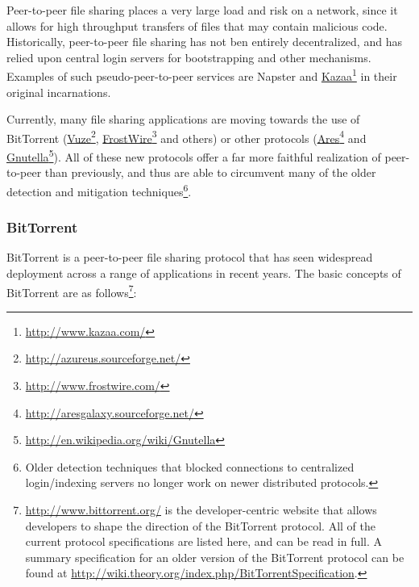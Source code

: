 \documentclass{article}
\newcommand{\hreff}[2]{\href{#1}{#2}\footnote{\url{#1}}}
\theoremstyle{remark}
\theoremstyle{definition}
\theoremstyle{definition}
\theoremstyle{definition}
\begin{document}
Peer-to-peer file sharing places a very large load and risk on a network, since it allows for high throughput transfers of files that may contain malicious code. Historically, peer-to-peer file sharing has not ben entirely decentralized, and has relied upon central login servers for bootstrapping and other mechanisms. Examples of such pseudo-peer-to-peer services are Napster and \hreff{http://www.kazaa.com/}{Kazaa} in their original incarnations.

Currently, many file sharing applications are moving towards the use of BitTorrent (\hreff{http://azureus.sourceforge.net/}{Vuze}, \hreff{http://www.frostwire.com/}{FrostWire} and others) or other protocols (\hreff{http://aresgalaxy.sourceforge.net/}{Ares} and \hreff{http://en.wikipedia.org/wiki/Gnutella}{Gnutella}). All of these new protocols offer a far more faithful realization of peer-to-peer than previously, and thus are able to circumvent many of the older detection and mitigation techniques\footnote{Older detection techniques that blocked connections to centralized login/indexing servers no longer work on newer distributed protocols.}.

\subsubsection{BitTorrent}
BitTorrent is a peer-to-peer file sharing protocol that has seen widespread deployment across a range of applications in recent years. The basic concepts of BitTorrent are as follows\footnote{\url{http://www.bittorrent.org/} is the developer-centric website that allows developers to shape the direction of the BitTorrent protocol. All of the current protocol specifications are listed here, and can be read in full. A summary specification for an older version of the BitTorrent protocol can be found at \url{http://wiki.theory.org/index.php/BitTorrentSpecification}.}:
\end{document}
